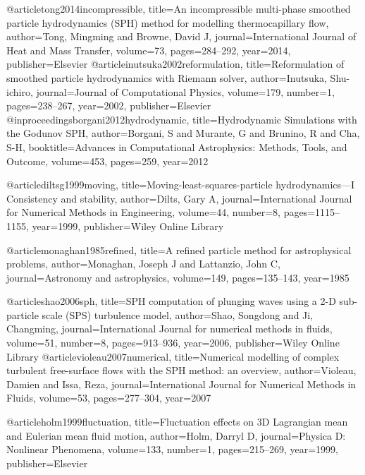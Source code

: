 @article{tong2014incompressible,
  title={An incompressible multi-phase smoothed particle hydrodynamics (SPH) method for modelling thermocapillary flow},
  author={Tong, Mingming and Browne, David J},
  journal={International Journal of Heat and Mass Transfer},
  volume={73},
  pages={284--292},
  year={2014},
  publisher={Elsevier}
}
@article{inutsuka2002reformulation,
  title={Reformulation of smoothed particle hydrodynamics with Riemann solver},
  author={Inutsuka, Shu-ichiro},
  journal={Journal of Computational Physics},
  volume={179},
  number={1},
  pages={238--267},
  year={2002},
  publisher={Elsevier}
}
@inproceedings{borgani2012hydrodynamic,
  title={Hydrodynamic Simulations with the Godunov SPH},
  author={Borgani, S and Murante, G and Brunino, R and Cha, S-H},
  booktitle={Advances in Computational Astrophysics: Methods, Tools, and Outcome},
  volume={453},
  pages={259},
  year={2012}
}

@article{diltsg1999moving,
  title={Moving-least-squares-particle hydrodynamics—I Consistency and stability},
  author={Dilts, Gary A},
  journal={International Journal for Numerical Methods in Engineering},
  volume={44},
  number={8},
  pages={1115--1155},
  year={1999},
  publisher={Wiley Online Library}
}

@article{monaghan1985refined,
  title={A refined particle method for astrophysical problems},
  author={Monaghan, Joseph J and Lattanzio, John C},
  journal={Astronomy and astrophysics},
  volume={149},
  pages={135--143},
  year={1985}
}

@article{shao2006sph,
  title={SPH computation of plunging waves using a 2-D sub-particle scale (SPS) turbulence model},
  author={Shao, Songdong and Ji, Changming},
  journal={International Journal for numerical methods in fluids},
  volume={51},
  number={8},
  pages={913--936},
  year={2006},
  publisher={Wiley Online Library}
}
@article{violeau2007numerical,
  title={Numerical modelling of complex turbulent free-surface flows with the SPH method: an overview},
  author={Violeau, Damien and Issa, Reza},
  journal={International Journal for Numerical Methods in Fluids},
  volume={53},
  pages={277--304},
  year={2007}
}

@article{holm1999fluctuation,
  title={Fluctuation effects on 3D Lagrangian mean and Eulerian mean fluid motion},
  author={Holm, Darryl D},
  journal={Physica D: Nonlinear Phenomena},
  volume={133},
  number={1},
  pages={215--269},
  year={1999},
  publisher={Elsevier}
}

